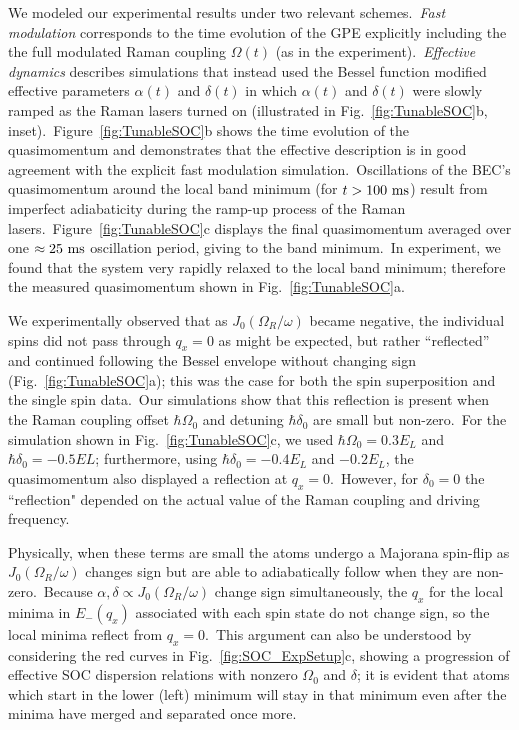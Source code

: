 \documentclass[twocolumn,amsmath,amssymb,floatfix,prl]{revtex4-1}
\begin{document}
We modeled our experimental results under two relevant schemes.~{\it Fast modulation} corresponds to the time evolution of the GPE explicitly including the the full modulated Raman coupling $\Omega(t)$ (as in the experiment).~{\it Effective dynamics} describes simulations that instead used the Bessel function modified effective parameters $\alpha(t)$ and $\delta(t)$ in which $\alpha(t)$ and  $\delta(t)$ were slowly ramped as the Raman lasers turned on (illustrated in Fig.~\ref{fig:TunableSOC}b, inset).~Figure~\ref{fig:TunableSOC}b shows the time evolution of the quasimomentum and demonstrates that the effective description is in good agreement with the explicit fast modulation simulation.~Oscillations of the BEC's quasimomentum around the local band minimum (for ${t>100~{\rm ms}}$) result from imperfect adiabaticity during the ramp-up process of the Raman lasers.~Figure~\ref{fig:TunableSOC}c displays the final quasimomentum averaged over one $\approx 25\ {\rm ms}$ oscillation period, giving to the band minimum.~In experiment, we found that the system very rapidly relaxed to the local band minimum; therefore the measured quasimomentum shown in Fig.~\ref{fig:TunableSOC}a.

We experimentally observed that as $J_0(\Omega_R/\omega)$ became negative, the individual spins did not pass through $q_x=0$ as might be expected, but rather ``reflected'' and continued following the Bessel envelope without changing sign (Fig.~\ref{fig:TunableSOC}a); this was the case for both the spin superposition and the single spin data.~Our simulations show that this reflection is present when the Raman coupling offset $\hbar\Omega _{0}$ and detuning $\hbar \delta_0$ are small but non-zero.~For the simulation shown in Fig.~\ref{fig:TunableSOC}c, we used $\hbar\Omega_0 = 0.3E_L$ and $\hbar\delta_0 = -0.5EL$; furthermore, using $\hbar\delta_0 = -0.4E_L$ and  $-0.2E_L$, the quasimomentum also displayed a reflection at $q_x=0$.~However, for $\delta_0 = 0$ the ``reflection" depended on the actual value of the Raman coupling and driving frequency.~

Physically, when these terms are small the atoms undergo a Majorana spin-flip as $J_0(\Omega_R/\omega)$ changes sign but are able to adiabatically follow when they are non-zero.~Because $\alpha, \delta\propto J_0(\Omega_R / \omega)$ change sign simultaneously, the $q_x$ for the local minima in $E_{-}(q_x)$ associated with each spin state do not change sign, so the local minima reflect from $q_x=0$.~This argument can also be understood by considering the red curves in Fig.~\ref{fig:SOC_ExpSetup}c, showing a progression of effective SOC dispersion relations with nonzero $\Omega_0$ and $\delta$; it is evident that atoms which start in the lower (left) minimum will stay in that minimum even after the minima have merged and separated once more.
\end{document}
